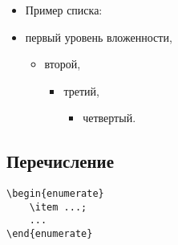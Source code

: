 \documentclass[14pt, a4paper, titlepage]{extarticle}
\begin{document}
\begin{itemize}
    \item[] Пример списка:
    \item первый уровень вложенности,
    \begin{itemize}
        \item второй,
        \begin{itemize}
            \item третий,
            \begin{itemize}
                \item четвертый.
            \end{itemize}
        \end{itemize}
    \end{itemize}
\end{itemize}

\subsection{Перечисление}

\begin{verbatim}
\begin{enumerate}
    \item ...;
    ...
\end{enumerate} 
\end{verbatim}
\end{document}
